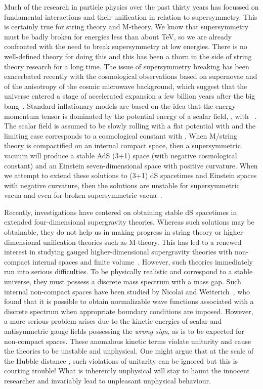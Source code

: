 \documentclass[a4paper,12pt]{article}
\begin{document}
Much of the research in particle physics over the past thirty years has
focussed on fundamental interactions and their unification in relation to
supersymmetry. This is certainly true for string theory and M-theory. We
know that supersymmetry must be badly broken for energies less than about
\coordHE{} TeV, so we are already confronted with the need to break
supersymmetry at low energies. There is no well-defined theory for doing
this and this has been a thorn in the side of string theory research for a
long time. The issue of supersymmetry breaking has been exacerbated
recently with the cosmological observations based on supernovae and of the
anisotropy of the cosmic microwave background, which suggest that the
universe entered a stage of accelerated expansion a few billion years after
the big bang~\cite{Perlmutter,Netterfield}. Standard inflationary models are based on
the idea that the energy-momentum tensor is dominated by the potential energy of a
scalar field, \coordHE{}, with \coordHE{}~\cite{Linde}. The scalar field is assumed to
be slowly rolling with a flat potential with \coordHE{} and the
limiting case \coordHE{} corresponds to a cosmological constant with \coordHE{}.
When M/string theory is compactified on an internal compact space, then a
supersymmetric vacuum will produce a stable AdS (3+1) space (with negative
cosmological constant) and an Einstein seven-dimensional space with positive
curvature. When we attempt to extend these solutions to (3+1) dS spacetimes and
Einstein spaces with negative curvature, then the solutions are unstable for
supersymmetric vacua and even for broken supersymmetric
vacua~\cite{Gibbons,Maldacena}.

Recently, investigations have centered on obtaining stable dS spacetimes in
extended four-dimensional supergravity theories. Whereas such solutions may
be obtainable, they do not help us in making progress in string theory or
higher-dimensional unification theories such as M-theory. This has led to a
renewed interest in studying gauged higher-dimensional supergravity
theories with non-compact internal spaces and finite
volume~\cite{Hull}. However, such theories immediately run into
serious difficulties. To be physically realistic and correspond
to a stable universe, they must possess a discrete mass spectrum
with a mass gap. Such internal non-compact spaces have been
studied by Nicolai and Wetterich~\cite{Nicolai}, who found that
it is possible to obtain normalizable wave functions associated
with a discrete spectrum when appropriate boundary conditions
are imposed. However, a more serious problem arises due to the
kinetic energies of scalar and antisymmetric gauge fields
possessing the {\it wrong sign}, as is to be expected for
non-compact spaces. These anomalous kinetic terms violate
unitarity and cause the theories to be unstable and unphysical.
One might argue that at the scale of the Hubble distance
\coordHE{}, such violations of unitarity can be ignored but this
is courting trouble! What is inherently unphysical will stay to
haunt the innocent researcher and invariably lead to unpleasant
unphysical behaviour.
\end{document}
